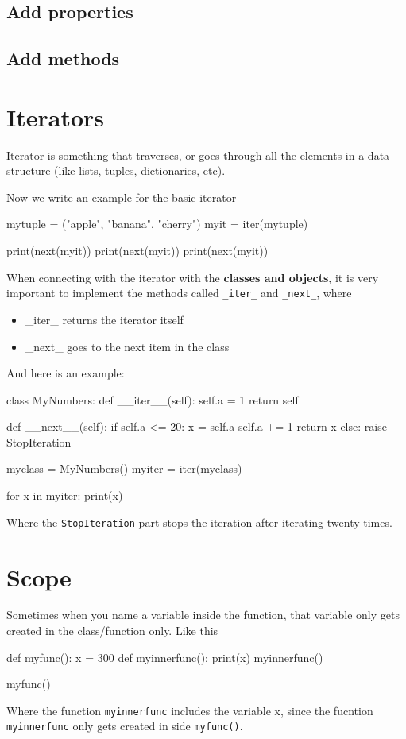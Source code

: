 \documentclass[12pt]{article}
\begin{document}
\subsection{Add properties}
\subsection{Add methods}
\section{Iterators}
Iterator is something that traverses, or goes through all the elements in a data structure (like lists, tuples, dictionaries, etc).

Now we write an example for the basic iterator
\begin{python}
mytuple = ("apple", "banana", "cherry")
myit = iter(mytuple)

print(next(myit))
print(next(myit))
print(next(myit))
\end{python}

When connecting with the iterator with the \textbf{classes and objects}, it is very important to implement the methods called \texttt{\_iter\_} and \texttt{\_next\_}, where
\begin{itemize}
	\item \_iter\_ returns the iterator itself
	\item \_next\_ goes to the next item in the class
\end{itemize}
And here is an example:
\begin{python}
	class MyNumbers:
  def __iter__(self):
    self.a = 1
    return self

  def __next__(self):
    if self.a <= 20:
      x = self.a
      self.a += 1
      return x
    else:
      raise StopIteration

myclass = MyNumbers()
myiter = iter(myclass)

for x in myiter:
  print(x)
\end{python}

Where the \texttt{StopIteration} part stops the iteration after iterating twenty times. 
\section{Scope}
Sometimes when you name a variable inside the function, that variable only gets created in the class/function only. Like this
\begin{python}
	def myfunc():
  x = 300
		def myinnerfunc():
			print(x)
			myinnerfunc()

myfunc()

\end{python}
Where the function \texttt{myinnerfunc} includes the variable x, since the fucntion \texttt{myinnerfunc} only gets created in side \texttt{myfunc()}. 
\end{document}
